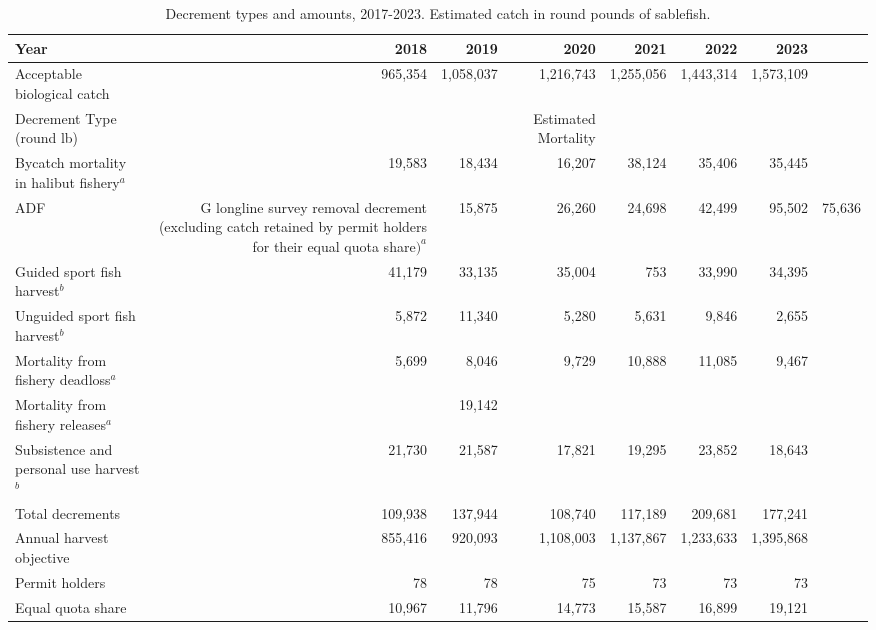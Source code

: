 \documentclass[
]{article}
\begin{document}
\begin{longtable}[t]{lrrrrrr}
\caption{\label{tab:decrements}Decrement types and amounts, 2017-2023.  Estimated catch in round pounds of sablefish.}\\
\toprule
Year & 2018 & 2019 & 2020 & 2021 & 2022 & 2023\\
\midrule
Acceptable biological catch & 965,354 & 1,058,037 & 1,216,743 & 1,255,056 & 1,443,314 & 1,573,109\\
Decrement Type (round lb) &  &  & Estimated Mortality &  &  & \\
Bycatch mortality in halibut fishery$^a$ & 19,583 & 18,434 & 16,207 & 38,124 & 35,406 & 35,445\\
ADF&G longline survey removal decrement (excluding catch retained by permit holders for their equal quota share$)^a$ & 15,875 & 26,260 & 24,698 & 42,499 & 95,502 & 75,636\\
Guided sport fish harvest$^b$ & 41,179 & 33,135 & 35,004 & 753 & 33,990 & 34,395\\
\addlinespace
Unguided sport fish harvest$^b$ & 5,872 & 11,340 & 5,280 & 5,631 & 9,846 & 2,655\\
Mortality from fishery deadloss$^a$ & 5,699 & 8,046 & 9,729 & 10,888 & 11,085 & 9,467\\
Mortality from fishery releases$^a$ &  & 19,142 &  &  &  & \\
Subsistence and personal use harvest$^b$ & 21,730 & 21,587 & 17,821 & 19,295 & 23,852 & 18,643\\
Total decrements & 109,938 & 137,944 & 108,740 & 117,189 & 209,681 & 177,241\\
\addlinespace
Annual harvest objective & 855,416 & 920,093 & 1,108,003 & 1,137,867 & 1,233,633 & 1,395,868\\
Permit holders & 78 & 78 & 75 & 73 & 73 & 73\\
Equal quota share & 10,967 & 11,796 & 14,773 & 15,587 & 16,899 & 19,121\\
\bottomrule
\end{longtable}
\end{document}
